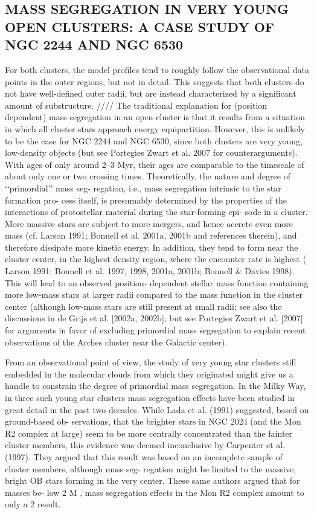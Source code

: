 \documentclass[../main.tex]{subfiles}
\begin{document}
{\subsection{MASS SEGREGATION IN VERY YOUNG OPEN CLUSTERS:
	A CASE STUDY OF NGC 2244 AND NGC 6530}
For both clusters, the model profiles tend to roughly follow the
observational data points in the outer regions, but not in detail. This
suggests that both clusters do not have well-defined outer radii, but
are instead characterized by a significant amount of substructure.
////
The traditional explanation for (position dependent) mass
segregation in an open cluster is that it results from a situation in
which all cluster stars approach energy equipartition. However,
this is unlikely to be the case for NGC 2244 and NGC 6530, since
both clusters are very young, low-density objects (but see Portegies
Zwart et al. 2007 for counterarguments). With ages of only around
2–3 Myr, their ages are comparable to the timescale of about only
one or two crossing times.
Theoretically, the nature and degree of ‘‘primordial’’ mass seg-
regation, i.e., mass segregation intrinsic to the star formation pro-
cess itself, is presumably determined by the properties of the
interactions of protostellar material during the star-forming epi-
sode in a cluster. More massive stars are subject to more mergers,
and hence accrete even more mass (cf. Larson 1991; Bonnell
et al. 2001a, 2001b and references therein), and therefore dissipate
more kinetic energy. In addition, they tend to form near the cluster
center, in the highest density region, where the encounter rate is
highest ( Larson 1991; Bonnell et al. 1997, 1998, 2001a, 2001b;
Bonnell & Davies 1998). This will lead to an observed position-
dependent stellar mass function containing more low-mass stars at larger radii compared to the mass function in the cluster center
(although low-mass stars are still present at small radii; see also
the discussions in de Grijs et al. [2002a, 2002b]; but see Portegies
Zwart et al. [2007] for arguments in favor of excluding primordial
mass segregation to explain recent observations of the Arches
cluster near the Galactic center).

From an observational point of view, the study of very young
star clusters still embedded in the molecular clouds from which
they originated might give us a handle to constrain the degree of
primordial mass segregation. In the Milky Way, in three such
young star clusters mass segregation effects have been studied in
great detail in the past two decades.
While Lada et al. (1991) suggested, based on ground-based ob-
servations, that the brighter stars in NGC 2024 (and the Mon R2
complex at large) seem to be more centrally concentrated than the
fainter cluster members, this evidence was deemed inconclusive
by Carpenter et al. (1997). They argued that this result was based
on an incomplete sample of cluster members, although mass seg-
regation might be limited to the massive, bright OB stars forming
in the very center. These same authors argued that for masses be-
low 2 M , mass segregation effects in the Mon R2 complex amount
to only a 2 result.

}
\end{document}
